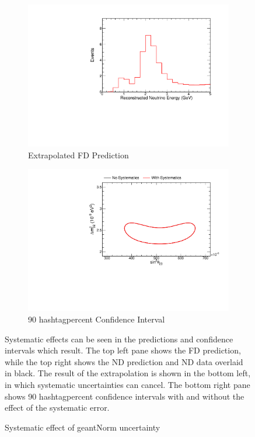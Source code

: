 {\begin{figure}
\begin{center}
\begin{subfigure}[c]{0.49\textwidth}
\includegraphics[width=\textwidth]{figures/systs/prediction/fd_extrap_prediction_geantNorm.pdf}
\caption*{Extrapolated FD Prediction}
\end{subfigure}
\begin{subfigure}[c]{0.49\textwidth}
\includegraphics[width=\textwidth]{figures/systs/prediction/fd_extrap_contour_geantNorm.pdf}
\caption*{90 hashtagpercent Confidence Interval}
\end{subfigure}
\end{center}
\caption{Systematic effect of geantNorm uncertainty}{
Systematic effects can be seen in the predictions and confidence intervals
which result.
The top left pane shows the FD prediction, while the top right shows the
ND prediction and ND data overlaid in black.
The result of the extrapolation is shown in the bottom left, in which
systematic uncertainties can cancel.
The bottom right pane shows 90 hashtagpercent confidence intervals with and without
the effect of the systematic error.}
\label{syst_fig_geantNorm}


\end{figure}}
